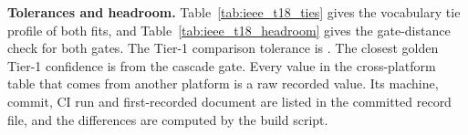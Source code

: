 \documentclass[conference,onecolumn,a4paper]{IEEEtran}
\begin{document}
\textbf{Tolerances and headroom.} Table~\ref{tab:ieee_t18_ties} gives the vocabulary tie profile of both fits, and Table~\ref{tab:ieee_t18_headroom} gives the gate-distance check for both gates. The Tier-1 comparison tolerance is . The closest golden Tier-1 confidence is  from the cascade gate. Every value in the cross-platform table that comes from another platform is a raw recorded value. Its machine, commit, CI run and first-recorded document are listed in the committed record file, and the differences are computed by the build script.






\end{document}
